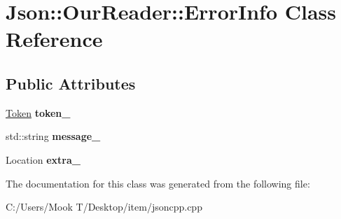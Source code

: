 \hypertarget{class_json_1_1_our_reader_1_1_error_info}{}\section{Json\+:\+:Our\+Reader\+:\+:Error\+Info Class Reference}
\label{class_json_1_1_our_reader_1_1_error_info}
\subsection*{Public Attributes}
\begin{DoxyCompactItemize}
\item 
\hypertarget{class_json_1_1_our_reader_1_1_error_info_ad05204ecabe5e7201a842935b874ae9a}{}\hyperlink{class_json_1_1_our_reader_1_1_token}{Token} {\bfseries token\+\_\+}\label{class_json_1_1_our_reader_1_1_error_info_ad05204ecabe5e7201a842935b874ae9a}

\item 
\hypertarget{class_json_1_1_our_reader_1_1_error_info_a9c973ff4d2c47134b770027d5d37d906}{}std\+::string {\bfseries message\+\_\+}\label{class_json_1_1_our_reader_1_1_error_info_a9c973ff4d2c47134b770027d5d37d906}

\item 
\hypertarget{class_json_1_1_our_reader_1_1_error_info_a77ba2d32a471c7b9bc14621b76a5bdab}{}Location {\bfseries extra\+\_\+}\label{class_json_1_1_our_reader_1_1_error_info_a77ba2d32a471c7b9bc14621b76a5bdab}

\end{DoxyCompactItemize}


The documentation for this class was generated from the following file\+:\begin{DoxyCompactItemize}
\item 
C\+:/\+Users/\+Mook T/\+Desktop/item/jsoncpp.\+cpp\end{DoxyCompactItemize}
